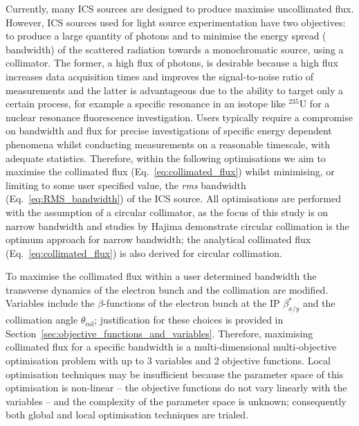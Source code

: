 \documentclass[../main.tex]{subfiles}
\begin{document}
Currently, many ICS sources \cite{deitrick2017inverse,deitrick2018high,pan2019design,dupraz2020thomx} are designed to produce maximise uncollimated flux. However, ICS sources used for light source experimentation have two objectives: to produce a large quantity of photons and to minimise the energy spread ( bandwidth) of the scattered radiation towards a monochromatic source, using a collimator. The former, a high flux of photons, is desirable because a high flux increases data acquisition times and improves the signal-to-noise ratio of measurements and the latter is advantageous due to the ability to target only a certain process, for example a specific resonance in an isotope like $^{235}\mathrm{U}$ for a nuclear resonance fluorescence investigation. Users typically require a compromise on bandwidth and flux for precise investigations of specific energy dependent phenomena whilst conducting measurements on a reasonable timescale, with adequate statistics. Therefore, within the following optimisations we aim to maximise the collimated flux (Eq.~\ref{eq:collimated_flux}) whilst minimising, or limiting to some user specified value, the \textit{rms} bandwidth (Eq.~\ref{eq:RMS_bandwidth}) of the ICS source. All optimisations are performed with the assumption of a circular collimator, as the focus of this study is on narrow bandwidth and studies by Hajima \cite{hajima2021bandwidth} demonstrate circular collimation is the optimum approach for narrow bandwidth; the analytical collimated flux (Eq.~\ref{eq:collimated_flux}) is also derived for circular collimation.

To maximise the collimated flux within a user determined bandwidth the transverse dynamics of the electron bunch and the collimation are modified. Variables include the $\beta$-functions of the electron bunch at the IP $\beta^{*}_{x/y}$ and the collimation angle $\theta_{\mathrm{col}}$; justification for these choices is provided in Section~\ref{sec:objective_functions_and_variables}. Therefore, maximising collimated flux for a specific bandwidth is a multi-dimensional multi-objective optimisation problem with up to 3 variables and 2 objective functions. Local optimisation techniques may be insufficient because the parameter space of this optimisation is non-linear -- the objective functions do not vary linearly with the variables -- and the complexity of the parameter space is unknown; consequently both global and local optimisation techniques are trialed.
\end{document}
